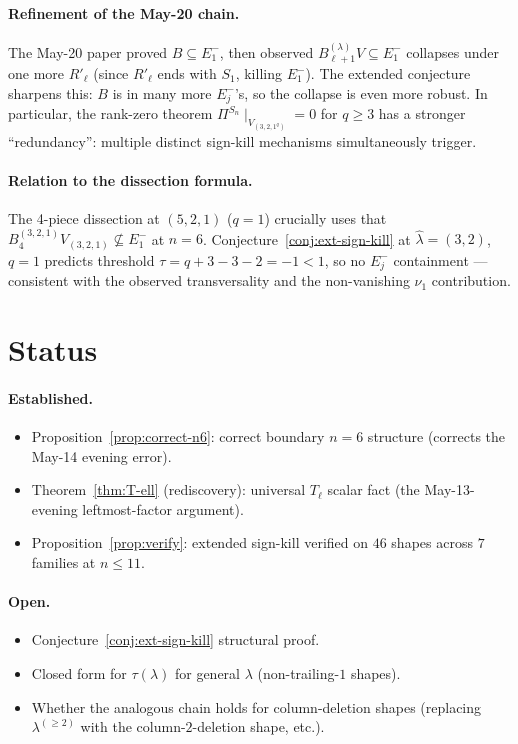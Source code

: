 \documentclass[11pt]{article}
\theoremstyle{definition}
\newcommand{\Sn}{S_n}
\newcommand{\Bdec}{B_{\ell+1}^{(\lambda)}}
\newcommand{\hatl}{\widehat\lambda}
\newcommand{\decl}{\lambda^{(\ge 2)}}
\begin{document}
\paragraph{Refinement of the May-20 chain.}  The May-20 paper proved
$B \subseteq E_1^-$, then observed $\Bdec V \subseteq E_1^-$ collapses
under one more $R'_\ell$ (since $R'_\ell$ ends with $S_1$, killing
$E_1^-$).  The extended conjecture sharpens this: $B$ is in many more
$E_j^-$'s, so the collapse is even more robust.  In particular,
the rank-zero theorem $\Pi^{\Sn} \!\mid_{V_{(3,2,1^q)}} = 0$
for $q \ge 3$ has a stronger ``redundancy'': multiple
distinct sign-kill mechanisms simultaneously trigger.

\paragraph{Relation to the dissection formula.}
The 4-piece dissection at $(5, 2, 1)$ ($q = 1$) crucially uses that
$B^{(3, 2, 1)}_4 V_{(3, 2, 1)} \not\subseteq E_1^-$ at $n = 6$.
Conjecture~\ref{conj:ext-sign-kill} at $\hatl = (3, 2)$, $q = 1$
predicts threshold $\tau = q + 3 - 3 - 2 = -1 < 1$, so no $E_j^-$
containment --- consistent with the observed transversality and the
non-vanishing $\nu_1$ contribution.

\section{Status}\label{sec:status}

\paragraph{Established.}
\begin{itemize}[topsep=0.2em,itemsep=0.1em]
\item Proposition~\ref{prop:correct-n6}: correct boundary
$n = 6$ structure (corrects the May-14 evening error).
\item Theorem~\ref{thm:T-ell} (rediscovery): universal
$T_\ell$ scalar fact (the May-13-evening leftmost-factor argument).
\item Proposition~\ref{prop:verify}: extended sign-kill verified on
$46$ shapes across $7$ families at $n \le 11$.
\end{itemize}

\paragraph{Open.}
\begin{itemize}[topsep=0.2em,itemsep=0.1em]
\item Conjecture~\ref{conj:ext-sign-kill} structural proof.
\item Closed form for $\tau(\lambda)$ for general $\lambda$
(non-trailing-$1$ shapes).
\item Whether the analogous chain holds for column-deletion shapes
(replacing $\decl$ with the column-$2$-deletion shape, etc.).
\end{itemize}
\end{document}
